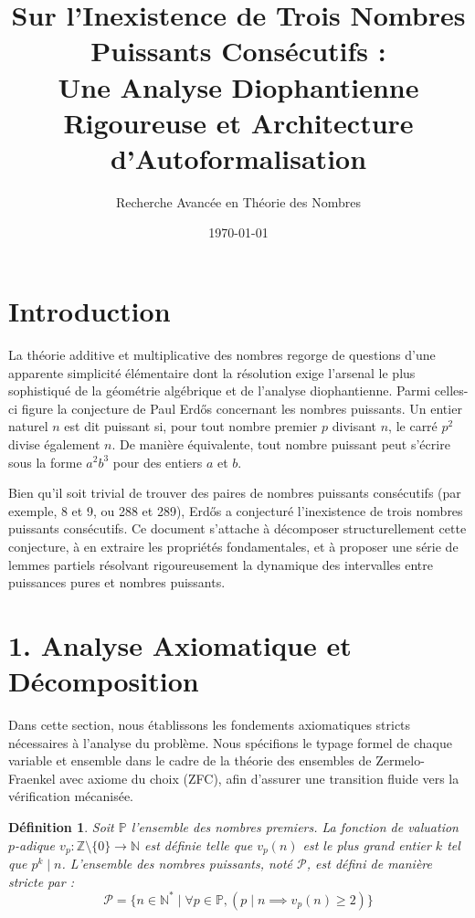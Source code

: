 \documentclass[11pt,a4paper]{article}
\title{Sur l'Inexistence de Trois Nombres Puissants Consécutifs : \\ Une Analyse Diophantienne Rigoureuse et Architecture d'Autoformalisation}
\author{Recherche Avancée en Théorie des Nombres}
\date{\today}
\newtheorem{definition}[theorem]{Définition}
\begin{document}
\maketitle
\tableofcontents
\newpage

\section{Introduction}

La théorie additive et multiplicative des nombres regorge de questions d'une apparente simplicité élémentaire dont la résolution exige l'arsenal le plus sophistiqué de la géométrie algébrique et de l'analyse diophantienne. Parmi celles-ci figure la conjecture de Paul Erdős concernant les nombres puissants. Un entier naturel $n$ est dit puissant si, pour tout nombre premier $p$ divisant $n$, le carré $p^2$ divise également $n$. De manière équivalente, tout nombre puissant peut s'écrire sous la forme $a^2b^3$ pour des entiers $a$ et $b$.

Bien qu'il soit trivial de trouver des paires de nombres puissants consécutifs (par exemple, 8 et 9, ou 288 et 289), Erdős a conjecturé l'inexistence de trois nombres puissants consécutifs. Ce document s'attache à décomposer structurellement cette conjecture, à en extraire les propriétés fondamentales, et à proposer une série de lemmes partiels résolvant rigoureusement la dynamique des intervalles entre puissances pures et nombres puissants.

\section{1. Analyse Axiomatique et Décomposition}

Dans cette section, nous établissons les fondements axiomatiques stricts nécessaires à l'analyse du problème. Nous spécifions le typage formel de chaque variable et ensemble dans le cadre de la théorie des ensembles de Zermelo-Fraenkel avec axiome du choix (ZFC), afin d'assurer une transition fluide vers la vérification mécanisée.

\begin{definition}
Soit $\mathbb{P}$ l'ensemble des nombres premiers. La fonction de valuation $p$-adique $v_p : \mathbb{Z} \setminus \{0\} \to \mathbb{N}$ est définie telle que $v_p(n)$ est le plus grand entier $k$ tel que $p^k \mid n$.
L'ensemble des nombres puissants, noté $\mathcal{P}$, est défini de manière stricte par :
\begin{equation}
\mathcal{P} = \{ n \in \mathbb{N}^* \mid \forall p \in \mathbb{P}, (p \mid n \implies v_p(n) \ge 2) \}
\end{equation}
\end{definition}
\end{document}
